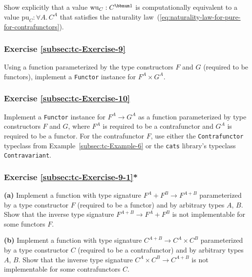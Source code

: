 Show explicitly that a value $\text{wu}_{C}:C^{\bbnum 1}$ is computationally
equivalent to a value $\text{pu}_{C}:\forall A.\,C^{A}$ that satisfies
the naturality law~(\ref{eq:naturality-law-for-pure-for-contrafunctors}).

\subsubsection{Exercise \label{subsec:tc-Exercise-9}\ref{subsec:tc-Exercise-9}}

Using a function parameterized by the type constructors $F$ and $G$
(required to be functors), implement a \lstinline!Functor! instance
for $F^{A}\times G^{A}$. 

\subsubsection{Exercise \label{subsec:tc-Exercise-10}\ref{subsec:tc-Exercise-10}}

Implement a \lstinline!Functor! instance for $F^{A}\rightarrow G^{A}$
as a function parameterized by type constructors $F$ and $G$, where
$F^{A}$ is required to be a contrafunctor and $G^{A}$ is required
to be a functor. For the contrafunctor $F$, use either the \lstinline!Contrafunctor!
typeclass from Example~\ref{subsec:tc-Example-6} or the \texttt{cats}
library's typeclass \lstinline!Contravariant!.

\subsubsection{Exercise \label{subsec:tc-Exercise-9-1}\ref{subsec:tc-Exercise-9-1}{*}}

\textbf{(a)} Implement a function with type signature $F^{A}+F^{B}\rightarrow F^{A+B}$
parameterized by a type constructor $F$ (required to be a functor)
and by arbitrary types $A$, $B$. Show that the inverse type signature
$F^{A+B}\rightarrow F^{A}+F^{B}$ is not implementable for some functors
$F$. %
\begin{comment}
A functor $F$ for which this is not implementable is $F^{A}\triangleq R\rightarrow A$
where $R$ is a fixed type.
\end{comment}

\textbf{(b)} Implement a function with type signature $C^{A+B}\rightarrow C^{A}\times C^{B}$
parameterized by a type constructor $C$ (required to be a contrafunctor)
and by arbitrary types $A$, $B$. Show that the inverse type signature
$C^{A}\times C^{B}\rightarrow C^{A+B}$ is not implementable for some
contrafunctors $C$.

